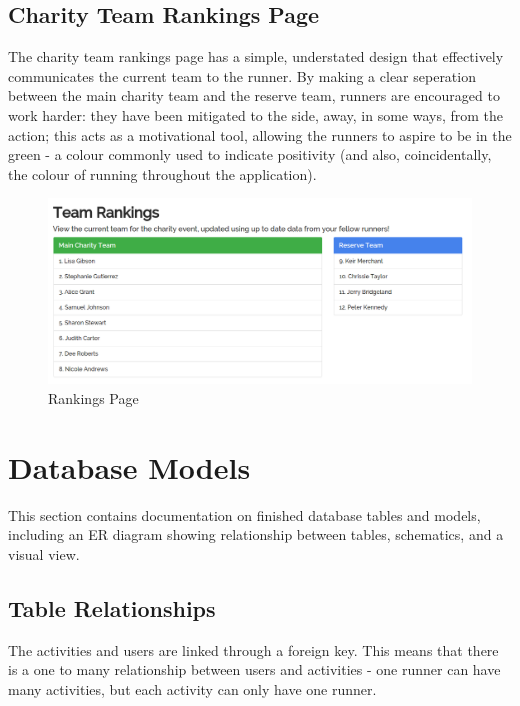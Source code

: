 \documentclass{article}[12pt,a4paper]
\begin{document}
\subsection{Charity Team Rankings Page}
The charity team rankings page has a simple, understated design that effectively communicates the current team to the runner. By making a clear seperation between the main charity team and the reserve team, runners are encouraged to work harder: they have been mitigated to the side, away, in some ways, from the action; this acts as a motivational tool, allowing the runners to aspire to be in the green - a colour commonly used to indicate positivity (and also, coincidentally, the colour of running throughout the application).

\begin{figure}[h!]
  \includegraphics[scale=0.35]{final_ui/rankings}
  \caption{Rankings Page}
\end{figure}

\clearpage

\section{Database Models}
This section contains documentation on finished database tables and models, including an ER diagram showing relationship between tables, schematics, and a visual view.

\subsection{Table Relationships}
The activities and users are linked through a foreign key. This means that there is a one to many relationship between users and activities - one runner can have many activities, but each activity can only have one runner.
\end{document}
